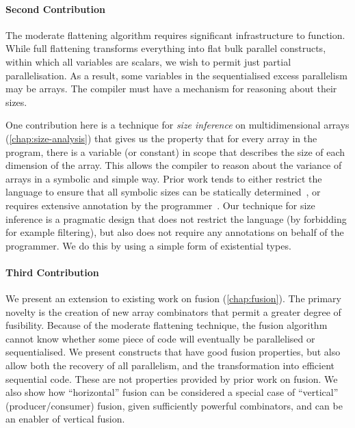 \paragraph{Second Contribution}

The moderate flattening algorithm requires significant infrastructure
to function.  While full flattening transforms everything into flat
bulk parallel constructs, within which all variables are scalars, we
wish to permit just partial parallelisation.  As a result, some
variables in the sequentialised excess parallelism may be arrays.  The
compiler must have a mechanism for reasoning about their sizes.

One contribution here is a technique for \textit{size inference} on
multidimensional arrays (\cref{chap:size-analysis}) that gives us the
property that for every array in the program, there is a variable (or
constant) in scope that describes the size of each dimension of the
array.  This allows the compiler to reason about the variance of
arrays in a symbolic and simple way.  Prior work tends to either
restrict the language to ensure that all symbolic sizes can be
statically determined~\cite{fish}, or requires extensive annotation by
the programmer~\cite{brady2013idris,bove2009dependent}.  Our technique
for size inference is a pragmatic design that does not restrict the
language (by forbidding for example filtering), but also does not
require any annotations on behalf of the programmer.  We do this by
using a simple form of existential types.

\paragraph{Third Contribution}

We present an extension to existing work on fusion
(\cref{chap:fusion}).  The primary novelty is the creation of new
array combinators that permit a greater degree of fusibility.  Because
of the moderate flattening technique, the fusion algorithm cannot know
whether some piece of code will eventually be parallelised or
sequentialised.  We present constructs that have good fusion
properties, but also allow both the recovery of all parallelism, and
the transformation into efficient sequential code.  These are not
properties provided by prior work on fusion.  We also show how
``horizontal'' fusion can be considered a special case of ``vertical''
(producer/consumer) fusion, given sufficiently powerful combinators,
and can be an enabler of vertical fusion.

